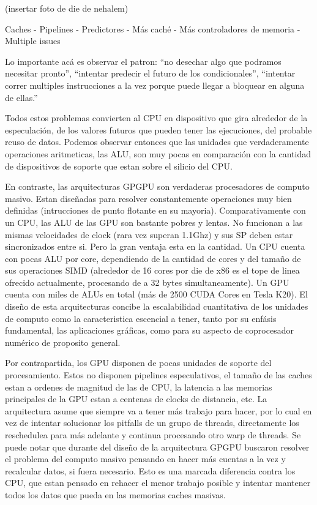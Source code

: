 (insertar foto de die de nehalem)

Caches - Pipelines - Predictores - M\'as cach\'e - M\'as controladores de memoria - Multiple issues

Lo importante ac\'a es observar el patron: ``no desechar algo que podramos necesitar pronto'',
``intentar predecir el futuro de los condicionales'', ``intentar correr multiples instrucciones a la vez
porque puede llegar a bloquear en alguna de ellas.''

Todos estos problemas convierten al CPU en dispositivo que gira alrededor de la especulaci\'on,
de los valores futuros que pueden tener las ejecuciones, del probable reuso de datos.
Podemos observar entonces que las unidades que verdaderamente operaciones aritmeticas,
las ALU, son muy pocas en comparaci\'on con la cantidad de dispositivos de soporte que estan
sobre el silicio del CPU.

En contraste, las arquitecturas GPGPU son verdaderas procesadores de computo masivo. Estan dise\~nadas para
resolver constantemente operaciones muy bien definidas (intrucciones de punto flotante en su mayoria).
Comparativamente con un CPU, las ALU de las GPU son bastante pobres y lentas. No funcionan a las mismas
velocidades de clock (rara vez superan 1.1Ghz) y sus SP deben estar sincronizados entre si. Pero la gran ventaja esta en la cantidad.
Un CPU cuenta con pocas ALU por core, dependiendo de la cantidad de cores y del tama\~no de sus operaciones SIMD
(alrededor de 16 cores por die de x86 es el tope de linea ofrecido actualmente, procesando de a 32 bytes simultaneamente).
Un GPU cuenta con miles de ALUs en total (m\'as de 2500 CUDA Cores en Tesla K20). El dise\~no de esta
arquitecturas concibe la escalabilidad cuantitativa de los unidades de computo como la caracteristica escencial a tener,
tanto por su enf\'asis fundamental, las aplicaciones gr\'aficas, como para su aspecto de coprocesador num\'erico
de proposito general.

Por contrapartida, los GPU disponen de pocas unidades de soporte del procesamiento. Estos no disponen pipelines
especulativos, el tama\~no de las caches estan a ordenes de magnitud de las de CPU, la latencia a las memorias
principales de la GPU estan a centenas de clocks de distancia, etc. La arquitectura asume que siempre va a tener m\'as trabajo
para hacer, por lo cual en vez de intentar solucionar los pitfalls de un grupo de threads, directamente
los reschedulea para m\'as adelante y continua procesando otro warp de threads. Se puede notar que durante del
dise\~no de la arquitectura GPGPU buscaron resolver el problema del computo masivo pensando en hacer
m\'as cuentas a la vez y recalcular datos, si fuera necesario. Esto es una marcada diferencia contra
los CPU, que estan pensado en rehacer el menor trabajo posible y intentar mantener todos los datos que pueda en
las memorias caches masivas.

